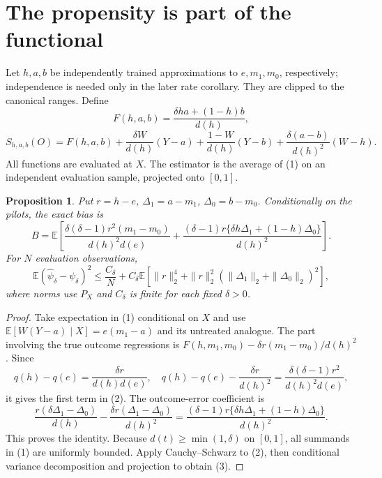 \documentclass[11pt]{article}
\newtheorem{proposition}[theorem]{Proposition}
\theoremstyle{definition}
\begin{document}
\section*{The propensity is part of the functional}
Let $h,a,b$ be independently trained approximations to $e,m_1,m_0$,
respectively; independence is needed only in the later rate corollary.
They are clipped to the canonical ranges. Define
\[
 F(h,a,b)=\frac{\delta ha+(1-h)b}{d(h)},
\]
\[
 S_{h,a,b}(O)=F(h,a,b)
 +\frac{\delta W}{d(h)}(Y-a)+\frac{1-W}{d(h)}(Y-b)
 +\frac{\delta(a-b)}{d(h)^2}(W-h).                       \tag{1}
\]
All functions are evaluated at $X$. The estimator is the average of (1)
on an independent evaluation sample, projected onto $[0,1]$.
\begin{proposition}
Put $r=h-e$, $\Delta_1=a-m_1$, $\Delta_0=b-m_0$.
Conditionally on the pilots, the exact bias is
\[
 B=\mathbb E\left[
 \frac{\delta(\delta-1)r^2(m_1-m_0)}{d(h)^2d(e)}
 +\frac{(\delta-1)r\{\delta h\Delta_1+(1-h)\Delta_0\}}
 {d(h)^2}\right].                                      \tag{2}
\]
For $N$ evaluation observations,
\[
 \mathbb E(\widehat\psi_\delta-\psi_\delta)^2
 \le \frac{C_\delta}{N}+C_\delta\mathbb E\left[
 \|r\|_2^4+\|r\|_2^2(\|\Delta_1\|_2+\|\Delta_0\|_2)^2\right],       \tag{3}
\]
where norms use $P_X$ and $C_\delta$ is finite for each fixed $\delta>0$.
\end{proposition}
\begin{proof}
Take expectation in (1) conditional on $X$ and use
$\mathbb E[W(Y-a)\mid X]=e(m_1-a)$ and its untreated analogue.
The part involving the true outcome regressions is
$F(h,m_1,m_0)-\delta r(m_1-m_0)/d(h)^2$.
Since
\[
 q(h)-q(e)=\frac{\delta r}{d(h)d(e)},\quad
 q(h)-q(e)-\frac{\delta r}{d(h)^2}
 =\frac{\delta(\delta-1)r^2}{d(h)^2d(e)},
\]
it gives the first term in (2). The outcome-error coefficient is
\[
 \frac{r(\delta\Delta_1-\Delta_0)}{d(h)}
 -\frac{\delta r(\Delta_1-\Delta_0)}{d(h)^2}
 =\frac{(\delta-1)r\{\delta h\Delta_1+(1-h)\Delta_0\}}{d(h)^2}.
\]
This proves the identity. Because $d(t)\ge\min(1,\delta)$ on $[0,1]$,
all summands in (1) are uniformly bounded. Apply Cauchy--Schwarz to (2),
then conditional variance decomposition and projection to obtain (3).
\end{proof}
\end{document}
